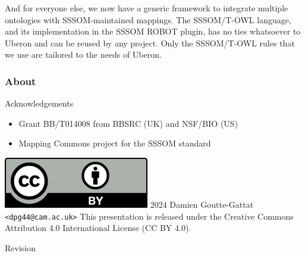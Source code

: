 \begin{frame}
{  And for everyone else, we now have a generic framework to integrate multiple
  ontologies with SSSOM-maintained mappings. The SSSOM/T-OWL language, and its
  implementation in the SSSOM ROBOT plugin, has no ties whatsoever to Uberon
  and can be reused by any project. Only the SSSOM/T-OWL rules that we use are
  tailored to the needs of Uberon.}

\end{frame}

\begin{frame}
  \frametitle{About}

  \begin{block}{Acknowledgements}
    \begin{itemize}
      \item Grant BB/T014008 from BBSRC (UK) and NSF/BIO (US)
      \item Mapping Commons project for the SSSOM standard
    \end{itemize}
  \end{block}

  \begin{block}{\includegraphics[scale=.26]{ccby}\hspace{.2em}%
    2024 Damien Goutte-Gattat \texttt{<dpg44@cam.ac.uk>}}
    This presentation is released under the Creative Commons Attribution
    4.0 International License (CC BY 4.0).
  \end{block}

  \begin{block}{Revision}\ttfamily\scriptsize
    
  \end{block}
\end{frame}

\appendix

